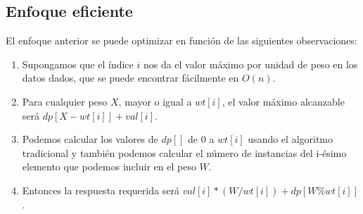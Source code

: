 \subsection{Enfoque eficiente}

El enfoque anterior se puede optimizar en función de las siguientes observaciones:

\begin{enumerate}
	\item Supongamos que el índice $i$ nos da el valor máximo por unidad de peso en los datos dados, que se puede encontrar fácilmente en $O(n)$.
	\item Para cualquier peso $X$, mayor o igual a $wt[i]$, el valor máximo alcanzable será $dp[X - wt[i]] + val[i]$.
	\item Podemos calcular los valores de $dp[]$ de $0$ a $wt[i]$ usando el algoritmo tradicional y también podemos calcular el número de instancias del i-ésimo elemento que podemos incluir en el peso $W$.
	\item Entonces la respuesta requerida será $val[i] * (W/wt[i]) + dp[W\%wt[i]]$.
\end{enumerate}